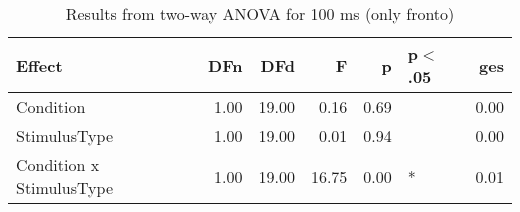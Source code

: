 \begin{table}[ht]
\centering
\begin{tabulary}{\textwidth}{lrrrrlr}
  \toprule
Effect & DFn & DFd & F & p & p$<$.05 & ges \\ 
  \midrule
Condition & 1.00 & 19.00 & 0.16 & 0.69 &  & 0.00 \\ 
  StimulusType & 1.00 & 19.00 & 0.01 & 0.94 &  & 0.00 \\ 
  Condition x StimulusType & 1.00 & 19.00 & 16.75 & 0.00 & * & 0.01 \\ 
   \bottomrule
\end{tabulary}
\caption{Results from two-way ANOVA for 100 ms (only fronto)} 
\end{table}
